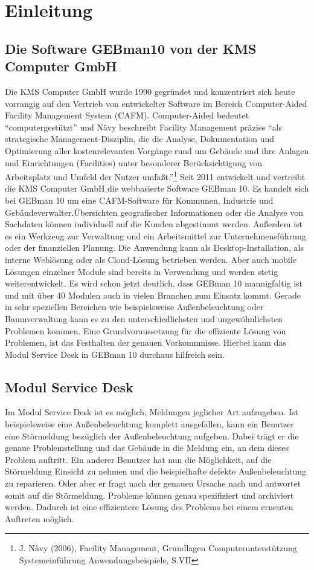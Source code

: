 \section{Einleitung}

\subsection{Die Software GEBman10 von der KMS Computer GmbH}
\noindent
Die KMS Computer GmbH wurde 1990 gegründet und konzentriert sich heute vorrangig auf den Vertrieb von entwickelter Software im Bereich Computer-Aided Facility Management System (CAFM).
Computer-Aided bedeutet \enquote{computergestützt} und Nävy beschreibt Facility Management präzise
\enquote{als strategische Management-Disziplin, die die Analyse, Dokumentation und Optimierung aller kostenrelevanten Vorgänge rund um Gebäude und ihre Anlagen und Einrichtungen (Facilities) unter besonderer Berücksichtigung von Arbeitsplatz und Umfeld der Nutzer umfaßt.}\footnote{J. Nävy (2006), Facility Management, Grundlagen Computerunterstützung Systemeinführung Anwendungsbeispiele, S.VII}
\noindent
Seit 2011 entwickelt und vertreibt die KMS Computer GmbH die webbasierte Software GEBman 10. Es handelt sich bei GEBman 10 um eine CAFM-Software für Kommunen, Industrie und Gebäudeverwalter.Übersichten geografischer Informationen oder die Analyse von Sachdaten können individuell auf die Kunden abgestimmt werden. Außerdem ist es ein Werkzeug zur Verwaltung und ein Arbeitsmittel zur Unternehmensführung oder der finanziellen Planung. Die Anwendung kann als Desktop-Installation, als interne Weblösung oder als Cloud-Lösung betrieben werden. Aber auch mobile Lösungen einzelner Module sind bereits in Verwendung und werden stetig weiterentwickelt. Es wird schon jetzt deutlich, dass GEBman 10 mannigfaltig ist und mit über 40 Modulen auch in vielen Branchen zum Einsatz kommt.
Gerade in sehr speziellen Bereichen wie beispielsweise Außenbeleuchtung oder Baumverwaltung kann es zu den unterschiedlichsten und ungewöhnlichsten Problemen kommen. Eine Grundvoraussetzung  für die effiziente Lösung von Problemen, ist das Festhalten der genauen Vorkommnisse. Hierbei kann das Modul Service Desk in GEBman 10 durchaus hilfreich sein.



\subsection{Modul Service Desk}
\noindent
Im Modul Service Desk ist es möglich, Meldungen jeglicher Art aufzugeben. Ist beispielsweise eine Außenbeleuchtung komplett ausgefallen, kann ein Benutzer eine Störmeldung bezüglich der Außenbeleuchtung aufgeben. Dabei trägt er die genaue Problemstellung und das Gebäude in die Meldung ein, an dem dieses Problem auftritt. Ein anderer Benutzer hat nun die Möglichkeit, auf die Störmeldung Einsicht zu nehmen und die beispielhafte defekte Außenbeleuchtung zu reparieren. Oder aber er fragt nach der genauen Ursache nach und antwortet somit auf die Störmeldung. Probleme können genau spezifiziert und archiviert werden. Dadurch ist eine effizientere Lösung des Problems bei einem erneuten Auftreten möglich.

